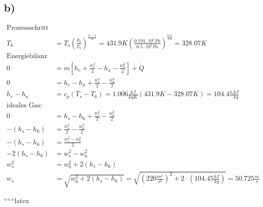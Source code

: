 

\subsection*{b)}

\begin{align*}
    \text{Prozessschritt 5-6 isentrop:} \\
    T_6 &= T_s \left( \frac{p_6}{p_5} \right)^{\frac{n-1}{n}} = 431.9K \left( \frac{0.194 \cdot 10^5 Pa}{0.5 \cdot 10^5 Pa} \right)^{\frac{0.4}{1.4}} = 328.07K \\
    \text{Energiebilanz an Schubdüse:} \\
    0 &= \dot{m} \left[ h_e + \frac{w_e^2}{2} - h_a - \frac{w_a^2}{2} \right] + \dot{Q} \\
    0 &= h_e - h_a + \frac{w_e^2}{2} - \frac{w_a^2}{2} \\
    h_e - h_a &= c_p \left( T_s - T_6 \right) = 1.006 \frac{kJ}{kgK} \left( 431.9K - 328.07K \right) = 104.45 \frac{kJ}{kg} \\
    \text{ideales Gas:} \\
    0 &= h_s - h_6 + \frac{w_s^2}{2} - \frac{w_6^2}{2} \\
    -(h_s - h_6) &= \frac{w_s^2}{2} - \frac{w_6^2}{2} \\
    -(h_s - h_6) &= \frac{w_s^2 - w_6^2}{2} \\
    -2(h_s - h_6) &= w_s^2 - w_6^2 \\
    w_s^2 &= w_6^2 + 2(h_s - h_6) \\
    w_s &= \sqrt{w_6^2 + 2(h_s - h_6)} = \sqrt{(220 \frac{m^2}{s^2})^2 + 2 \cdot (104.45 \frac{kJ}{kg})} = 50.725 \frac{m}{s}
\end{align*}

``````latex